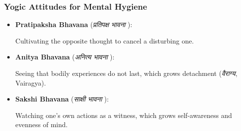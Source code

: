 \begin{frame}[fragile]\frametitle{Yogic Attitudes for Mental Hygiene}

      \begin{itemize}
        \item \textbf{Pratipaksha Bhavana} (\textit{प्रतिपक्ष भावना }):
        
        Cultivating the opposite thought to cancel a disturbing one.

        \item \textbf{Anitya Bhavana} (\textit{अनित्य भावना }):

        Seeing that bodily experiences do not last, which grows detachment (\textit{वैराग्य}, Vairagya).

        \item \textbf{Sakshi Bhavana} (\textit{साक्षी भावना }):

        Watching one's own actions as a witness, which grows self-awareness and evenness of mind.
        
      \end{itemize}

\end{frame}

